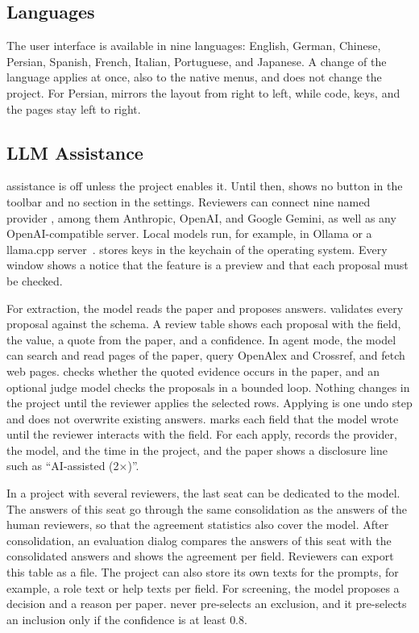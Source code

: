 \subsection{Languages}\label{sec:tool-languages}

The user interface is available in nine languages: English, German, Chinese, Persian, Spanish, French, Italian, Portuguese, and Japanese.
A change of the language applies at once, also to the native menus, and does not change the project.
For Persian, \SaiLoR mirrors the layout from right to left, while code, keys, and the \PDF pages stay left to right.

\subsection{\acs{LLM} Assistance}\label{sec:tool-llm}

\LLM assistance is off unless the project enables it.
Until then, \SaiLoR shows no \LLM button in the toolbar and no \LLM section in the settings.
Reviewers can connect nine named provider \APIs, among them Anthropic, OpenAI, and Google Gemini, as well as any OpenAI-compatible server.
Local models run, for example, in Ollama or a llama.cpp server~\cite{llamacpp}.
\SaiLoR stores \API keys in the keychain of the operating system.
Every \LLM window shows a notice that the feature is a preview and that each proposal must be checked.

For extraction, the model reads the paper and proposes answers.
\SaiLoR validates every proposal against the schema.
A review table shows each proposal with the field, the value, a quote from the paper, and a confidence.
In agent mode, the model can search and read pages of the paper, query OpenAlex and Crossref, and fetch web pages.
\SaiLoR checks whether the quoted evidence occurs in the paper, and an optional judge model checks the proposals in a bounded loop.
Nothing changes in the project until the reviewer applies the selected rows.
Applying is one undo step and does not overwrite existing answers.
\SaiLoR marks each field that the model wrote until the reviewer interacts with the field.
For each apply, \SaiLoR records the provider, the model, and the time in the project, and the paper shows a disclosure line such as \enquote{AI-assisted (2$\times$)}.

In a project with several reviewers, the last seat can be dedicated to the model.
The answers of this seat go through the same consolidation as the answers of the human reviewers, so that the agreement statistics also cover the model.
After consolidation, an evaluation dialog compares the answers of this seat with the consolidated answers and shows the agreement per field.
Reviewers can export this table as a \CSV file.
The project can also store its own texts for the prompts, for example, a role text or help texts per field.
For screening, the model proposes a decision and a reason per paper.
\SaiLoR never pre-selects an exclusion, and it pre-selects an inclusion only if the confidence is at least $0.8$.
